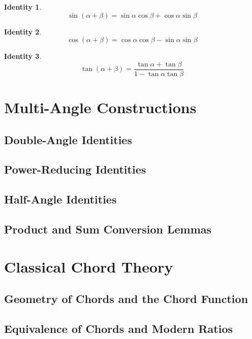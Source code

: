 \documentclass{article}
\theoremstyle{definition}
\theoremstyle{plain}
\newtheorem{identity}{Identity}[]
\begin{document}
\begin{identity}
    \[
    \sin(\alpha + \beta) = \sin \alpha \cos \beta + \cos \alpha \sin \beta
    \]
\end{identity}

\begin{identity}
    \[
    \cos(\alpha + \beta) = \cos \alpha \cos \beta - \sin \alpha \sin \beta
    \]
\end{identity}

\begin{identity}
    \[
    \tan(\alpha + \beta) = \frac{\tan \alpha + \tan \beta}{1 - \tan \alpha \tan \beta}
    \]
\end{identity}

\section{Multi-Angle Constructions}

\subsection{Double-Angle Identities}

\subsection{Power-Reducing Identities}

\subsection{Half-Angle Identities}

\subsection{Product and Sum Conversion Lemmas}

\section{Classical Chord Theory}

\subsection{Geometry of Chords and the Chord Function}

\subsection{Equivalence of Chords and Modern Ratios}
\end{document}
